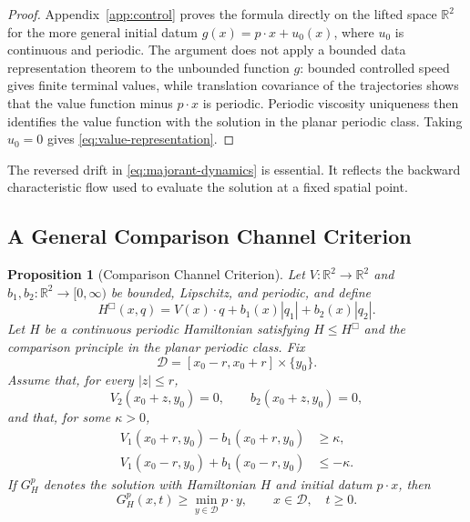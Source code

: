 \documentclass[11pt,reqno,noamsfonts]{amsart}
\newtheorem{proposition}[theorem]{Proposition}
\theoremstyle{definition}
\theoremstyle{remark}
\begin{document}
\begin{proof}
Appendix~\ref{app:control} proves the formula directly on the lifted
space $\mathbb R^2$ for the more general initial datum
$g(x)=p\cdot x+u_0(x)$, where $u_0$ is continuous and periodic. The
argument does not apply a bounded data representation theorem to the
unbounded function $g$: bounded controlled speed gives finite terminal
values, while translation covariance of the trajectories shows that the
value function minus $p\cdot x$ is periodic. Periodic viscosity
uniqueness then identifies the value function with the solution in the
planar periodic class. Taking $u_0=0$ gives
\eqref{eq:value-representation}.
\end{proof}

The reversed drift in \eqref{eq:majorant-dynamics} is essential.  It
reflects the backward characteristic flow used to evaluate the solution
at a fixed spatial point.

\subsection{A General Comparison Channel Criterion}

\begin{proposition}[Comparison Channel Criterion]
\label{prop:channel-criterion}
Let $V:\mathbb R^2\to\mathbb R^2$ and
$b_1,b_2:\mathbb R^2\to[0,\infty)$ be bounded, Lipschitz, and periodic,
and define
\[
  H^{\Box}(x,q)
  =V(x)\cdot q+b_1(x)|q_1|+b_2(x)|q_2|.
\]
Let $H$ be a continuous periodic Hamiltonian satisfying
$H\le H^{\Box}$ and the comparison principle in the planar periodic
class.  Fix
\[
  \mathcal D=[x_0-r,x_0+r]\times\{y_0\}.
\]
Assume that, for every $|z|\le r$,
\begin{equation}\label{eq:channel-normal}
  V_2(x_0+z,y_0)=0,
  \qquad
  b_2(x_0+z,y_0)=0,
\end{equation}
and that, for some $\kappa>0$,
\begin{equation}\label{eq:channel-endpoints}
\begin{aligned}
  V_1(x_0+r,y_0)-b_1(x_0+r,y_0)&\ge\kappa,\\
  V_1(x_0-r,y_0)+b_1(x_0-r,y_0)&\le-\kappa.
\end{aligned}
\end{equation}
If $G_H^p$ denotes the solution with Hamiltonian $H$ and initial datum
$p\cdot x$, then
\[
  G_H^p(x,t)
  \ge\min_{y\in\mathcal D}p\cdot y,
  \qquad
  x\in\mathcal D,
  \quad t\ge0.
\]
\end{proposition}
\end{document}
